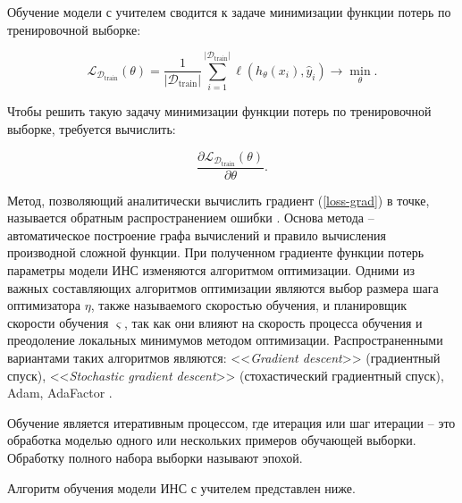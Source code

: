 Обучение модели с учителем сводится к задаче минимизации функции потерь по тренировочной выборке:

\begin{equation}
    \mathcal{L}_{\mathcal{D}_{\text{train}}}(\theta) = \frac{1}{\lvert \mathcal{D}_{\text{train}} \rvert}\sum_{i=1}^{\lvert \mathcal{D}_{\text{train}} \rvert}\ell(h_{\theta}(x_i),\hat y_i) \rightarrow \min_{\theta}.
\end{equation}

Чтобы решить такую задачу минимизации функции потерь по тренировочной выборке, требуется вычислить:

\begin{equation}
    \frac{\partial \mathcal{L}_{\mathcal{D}_{\text{train}}}(\theta)}{\partial \theta}.
    \label{loss-grad}
\end{equation}

Метод, позволяющий аналитически вычислить градиент (\ref{loss-grad}) в точке, называется обратным распространением ошибки \cite{backprop-theory}. Основа метода -- автоматическое построение графа вычислений и правило вычисления производной сложной функции. При полученном градиенте функции потерь параметры модели ИНС изменяются алгоритмом оптимизации. Одними из важных составляющих алгоритмов оптимизации являются выбор размера шага оптимизатора $\eta$, также называемого скоростью обучения, и планировщик скорости обучения $\varsigma$, так как они влияют на скорость процесса обучения и преодоление локальных минимумов методом оптимизации. Распространенными вариантами таких алгоритмов являются: <<\textit{Gradient descent}>> (градиентный спуск), <<\textit{Stochastic gradient descent}>> (стохастический градиентный спуск), Adam, AdaFactor \cite{optimizers-paper,adafactor-paper}.

Обучение является итеративным процессом, где итерация или шаг итерации -- это обработка моделью одного или нескольких примеров обучающей выборки. Обработку полного набора выборки называют эпохой.

Алгоритм обучения модели ИНС с учителем представлен ниже.

